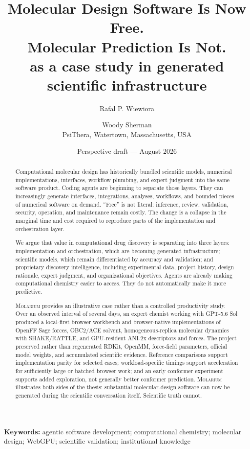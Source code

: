 \documentclass[11pt]{article}
\title{\textbf{Molecular Design Software Is Now Free.\\Molecular Prediction Is Not.}\\[0.55em]
\large \molarium{} as a case study in generated scientific infrastructure}
\author{Rafal P. Wiewiora \and Woody Sherman\\[0.35em]
\normalsize PsiThera, Watertown, Massachusetts, USA}
\date{Perspective draft --- August 2026}
\newcommand{\molarium}{\textnormal{\textsc{Molarium}}}
\begin{document}
\maketitle

\begin{abstract}
Computational molecular design has historically bundled scientific models, numerical implementations, interfaces, workflow plumbing, and expert judgment into the same software product.
Coding agents are beginning to separate those layers.
They can increasingly generate interfaces, integrations, analyses, workflows, and bounded pieces of numerical software on demand.
``Free'' is not literal: inference, review, validation, security, operation, and maintenance remain costly.
The change is a collapse in the marginal time and cost required to reproduce parts of the implementation and orchestration layer.

We argue that value in computational drug discovery is separating into three layers: implementation and orchestration, which are becoming generated infrastructure; scientific models, which remain differentiated by accuracy and validation; and proprietary discovery intelligence, including experimental data, project history, design rationale, expert judgment, and organizational objectives.
Agents are already making computational chemistry easier to access.
They do not automatically make it more predictive.

\molarium{} provides an illustrative case rather than a controlled productivity study.
Over an observed interval of several days, an expert chemist working with GPT-5.6 Sol produced a local-first browser workbench and browser-native implementations of OpenFF Sage forces, OBC2/ACE solvent, homogeneous-replica molecular dynamics with SHAKE/RATTLE, and GPU-resident ANI-2x descriptors and forces.
The project preserved rather than regenerated RDKit, OpenMM, force-field parameters, official model weights, and accumulated scientific evidence.
Reference comparisons support implementation parity for selected cases; workload-specific timings support acceleration for sufficiently large or batched browser work; and an early conformer experiment supports added exploration, not generally better conformer prediction.
\molarium{} illustrates both sides of the thesis: substantial molecular-design software can now be generated during the scientific conversation itself.
Scientific truth cannot.
\end{abstract}

\noindent\textbf{Keywords:}
agentic software development; computational chemistry; molecular design; WebGPU; scientific validation; institutional knowledge
\end{document}
